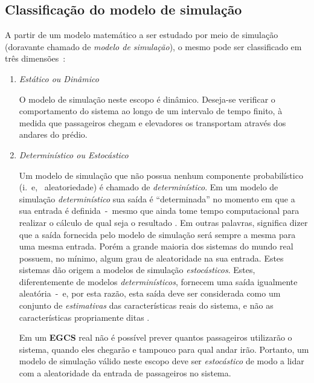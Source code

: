 \subsection{Classificação do modelo de simulação}

A partir de um modelo matemático a ser estudado por meio de simulação (doravante
chamado de \textit{modelo de simulação}), o mesmo pode ser classificado em três
dimensões~\cite{Banks,Law}:

\begin{enumerate}
\item \textit{Estático ou Dinâmico}

O modelo de simulação neste escopo é dinâmico. Deseja-se verificar o
comportamento do sistema ao longo de um intervalo de tempo finito, à medida que
passageiros chegam e elevadores os transportam através dos andares do prédio.

\item \textit{Determinístico ou Estocástico}

Um modelo de simulação que não possua nenhum componente probabilístico (i.~e,~
aleatoriedade) é chamado de \textit{determinístico}. Em um modelo de simulação
\textit{determinístico} sua saída é ``determinada'' no momento em que a sua
entrada é definida~-~mesmo que ainda tome tempo computacional para realizar o
cálculo de qual seja o resultado \cite{Law}. Em outras palavras, significa dizer
que a saída fornecida pelo modelo de simulação será sempre a mesma para uma
mesma entrada. Porém a grande maioria dos sistemas do mundo real possuem, no
mínimo, algum grau de aleatoridade na sua entrada. Estes sistemas dão origem a
modelos de simulação \textit{estocásticos}. Estes, diferentemente de modelos
\textit{determinísticos}, fornecem uma saída igualmente aleatória~-~e, por esta
razão, esta saída deve ser considerada como um conjunto de \textit{estimativas}
das características reais do sistema, e não as características propriamente
ditas \cite{Banks}.

Em um \textbf{EGCS} real não é possível prever quantos passageiros utilizarão o
sistema, quando eles chegarão e tampouco para qual andar irão. Portanto, um
modelo de simulação válido neste escopo deve ser \textit{estocástico} de modo a
lidar com a aleatoridade da entrada de passageiros no sistema.



\end{enumerate}
